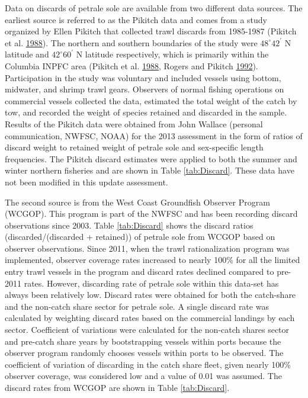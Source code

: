 \documentclass[12pt,]{article}
\begin{document}
Data on discards of petrale sole are available from two different data
sources. The earliest source is referred to as the Pikitch data and
comes from a study organized by Ellen Pikitch that collected trawl
discards from 1985-1987 (Pikitch et al.
\protect\hyperlink{ref-pikitch_evaluation_1988}{1988}). The northern and
southern boundaries of the study were \(48^\circ 42^\prime\) N latitude
and \(42^\circ 60^\prime\) N latitude respectively, which is primarily
within the Columbia INPFC area (Pikitch et al.
\protect\hyperlink{ref-pikitch_evaluation_1988}{1988}, Rogers and
Pikitch \protect\hyperlink{ref-rogers_numerical_1992}{1992}).
Participation in the study was voluntary and included vessels using
bottom, midwater, and shrimp trawl gears. Observers of normal fishing
operations on commercial vessels collected the data, estimated the total
weight of the catch by tow, and recorded the weight of species retained
and discarded in the sample. Results of the Pikitch data were obtained
from John Wallace (personal communication, NWFSC, NOAA) for the 2013
assessment in the form of ratios of discard weight to retained weight of
petrale sole and sex-specific length frequencies. The Pikitch discard
estimates were applied to both the summer and winter northern fisheries
and are shown in Table \ref{tab:Discard}. These data have not been
modified in this update assessment.

The second source is from the West Coast Groundfish Observer Program
(WCGOP). This program is part of the NWFSC and has been recording
discard observations since 2003. Table \ref{tab:Discard} shows the
discard ratios (discarded/(discarded + retained)) of petrale sole from
WCGOP based on observer observations. Since 2011, when the trawl
rationalization program was implemented, observer coverage rates
increased to nearly 100\% for all the limited entry trawl vessels in the
program and discard rates declined compared to pre-2011 rates. However,
discarding rate of petrale sole within this data-set has always been
relatively low. Discard rates were obtained for both the catch-share and
the non-catch share sector for petrale sole. A single discard rate was
calculated by weighting discard rates based on the commercial landings
by each sector. Coefficient of variations were calculated for the
non-catch shares sector and pre-catch share years by bootstrapping
vessels within ports because the observer program randomly chooses
vessels within ports to be observed. The coefficient of variation of
discarding in the catch share fleet, given nearly 100\% observer
coverage, was considered low and a value of 0.01 was assumed. The
discard rates from WCGOP are shown in Table \ref{tab:Discard}.
\end{document}

